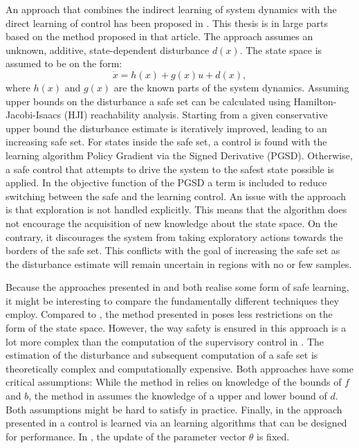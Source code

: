 \documentclass[../main.tex]{subfiles}
\begin{document}
An approach that combines the indirect learning of system dynamics with the direct learning of control has been proposed in \cite{akametalu2014reachability}. This thesis is in large parts based on the method proposed in that article. The approach assumes an unknown, additive, state-dependent disturbance $d(x)$. The state space is assumed to be on the form:
\begin{equation}
    \dot{x} = h(x)+g(x)u+d(x),
\end{equation}
where $h(x)$ and $g(x)$ are the known parts of the system dynamics.
Assuming upper bounds on the disturbance a safe set can be calculated using Hamilton-Jacobi-Isaacs (HJI) reachability analysis. Starting from a given conservative upper bound the disturbance estimate is iteratively improved, leading to an increasing safe set. For states inside the safe set, a control is found with the learning algorithm Policy Gradient via the Signed Derivative (PGSD). Otherwise, a safe control that attempts to drive the system to the safest state possible is applied. In the objective function of the PGSD a term is included to reduce switching between the safe and the learning control. An issue with the approach is that exploration is not handled explicitly. This means that the algorithm does not encourage the acquisition of new knowledge about the state space. On the contrary, it discourages the system from taking exploratory actions towards the borders of the safe set. This conflicts with the goal of increasing the safe set as the disturbance estimate will remain uncertain in regions with no or few samples. \par

Because the approaches presented in \cite{akametalu2014reachability} and \cite{wang1993stable} both realise some form of safe learning, it might be interesting to compare the fundamentally different techniques they employ.  Compared to \cite{wang1993stable}, the method presented in \cite{akametalu2014reachability} poses less restrictions on the form of the state space. However, the way safety is ensured in this approach is a lot more complex than the computation of the supervisory control in \cite{wang1993stable}. The estimation of the disturbance and subsequent computation of a safe set is theoretically complex and computationally expensive. Both approaches have some critical assumptions: While the method in \cite{wang1993stable} relies on knowledge of the bounds of $f$ and $b$, the method in \cite{akametalu2014reachability} assumes the knowledge of a upper and lower bound of $d$. Both assumptions might be hard to satisfy in practice. Finally, in the approach presented in \cite{akametalu2014reachability} a control is learned via an learning algorithms that can be designed for performance. In \cite{wang1993stable}, the update of the parameter vector $\theta$ is fixed.
\end{document}

